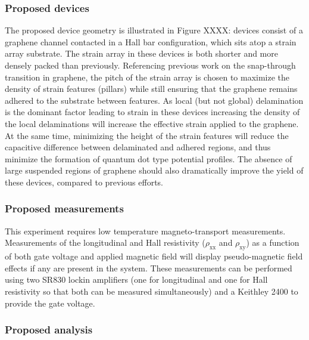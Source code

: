 \documentclass[edeposit,fullpage,draftthesis]{uiucthesis2009}
\begin{document}
            \subsubsection*{Proposed devices}
            
            The proposed device geometry is illustrated in Figure XXXX: devices consist of 
            a graphene channel contacted in a Hall bar configuration, which
            sits atop a strain array substrate. The strain array in these devices is both shorter
            and more densely packed than previously. Referencing previous work \cite{gill2015mechanical}
            on the snap-through transition in graphene, the pitch of the strain array is chosen to 
            maximize the density of strain features (pillars) while still ensuring that the 
            graphene remains adhered to the substrate between features. As local (but not global)
            delamination is the dominant factor leading to strain in these devices increasing
            the density of the local delaminations will increase the effective strain applied to
            the graphene. At the same time, minimizing the height of the strain features will
            reduce the capacitive difference between delaminated and adhered regions, and thus minimize
            the formation of quantum dot type potential profiles.
            The absence of large suspended regions of graphene should also dramatically improve
            the yield of these devices, compared to previous efforts.
            
            \subsubsection*{Proposed measurements}
            
            This experiment requires low temperature magneto-transport measurements.
            Measurements of the longitudinal and Hall resistivity ($\rho_\text{xx}$ and $\rho_\text{xy}$) as a
            function of both gate voltage and applied magnetic field will display pseudo-magnetic field effects
            if any are present in the system.
            These measurements can be performed using two SR830 lockin amplifiers (one for longitudinal and
            one for Hall resistivity so that both can be measured simultaneously) and a Keithley 2400
            to provide the gate voltage.
            
            \subsubsection*{Proposed analysis}
            
\end{document}
